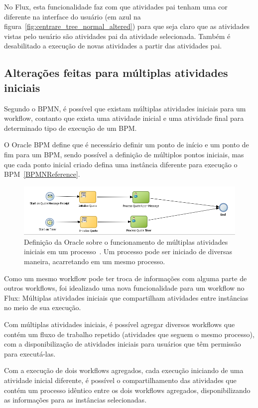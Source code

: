 No Flux, esta funcionalidade faz com que atividades pai tenham uma cor diferente na interface do usuário (em azul na figura~\ref{fig:centrare_tree_normal_altered}) para que seja claro que as atividades vistas pelo usuário são atividades pai da atividade selecionada. Também é desabilitado a execução de novas atividades a partir das atividades pai.

\subsection{Alterações feitas para múltiplas atividades iniciais}

Segundo o BPMN, é possível que existam múltiplas atividades iniciais para um workflow, contanto que exista uma atividade inicial e uma atividade final para determinado tipo de execução de um BPM.

O Oracle BPM define que é necessário definir um ponto de início e um ponto de fim para um BPM, sendo possível a definição de múltiplos pontos iniciais, mas que cada ponto inicial criado defina uma instância diferente para execução o BPM~\ref{BPMNReference}.

\begin{figure}
    \centering
    \includegraphics[width=1\textwidth]{imgs/BPM/Oracle_BPMN.png}
    \caption{Definição da Oracle sobre o funcionamento de múltiplas atividades iniciais em um processo~\cite{BPMNReference}. Um processo pode ser iniciado de diversas maneira, acarretando em um mesmo processo.}
    \label{fig:oracle_bpmn}
\end{figure}

Como um mesmo workflow pode ter troca de informações com alguma parte de outros workflows, foi idealizado uma nova funcionalidade para um workflow no Flux: Múltiplas atividades iniciais que compartilham atividades entre instâncias no meio de sua execução.

Com múltiplas atividades iniciais, é possível agregar diversos workflows que contém um fluxo de trabalho repetido (atividades que seguem o mesmo processo), com a disponibilização de atividades iniciais para usuários que têm permissão para executá-las.

Com a execução de dois workflows agregados, cada execução iniciando de uma atividade inicial diferente, é possível o compartilhamento das atividades que contém um processo idêntico entre os dois workflows agregados, disponibilizando as informações para as instâncias selecionadas.

